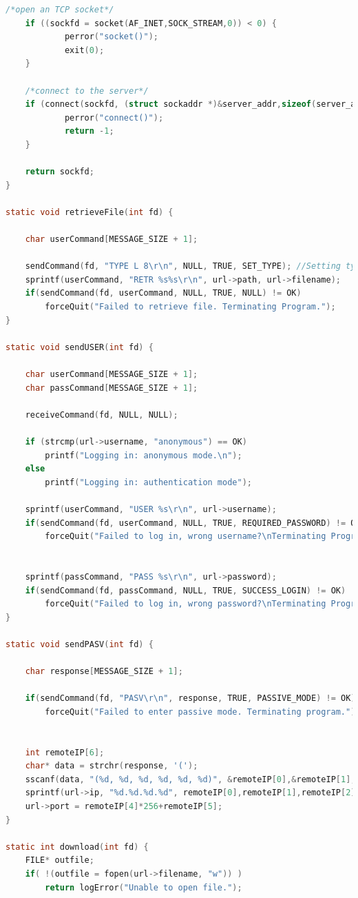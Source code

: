 \documentclass[a4paper, 11pt]{article}
\begin{document}
\begin{lstlisting}[language=C]
	/*open an TCP socket*/
	if ((sockfd = socket(AF_INET,SOCK_STREAM,0)) < 0) {
			perror("socket()");
			exit(0);
	}

	/*connect to the server*/
	if (connect(sockfd, (struct sockaddr *)&server_addr,sizeof(server_addr)) < 0){
			perror("connect()");
			return -1;
	}

	return sockfd;
}

static void retrieveFile(int fd) {

	char userCommand[MESSAGE_SIZE + 1];

	sendCommand(fd, "TYPE L 8\r\n", NULL, TRUE, SET_TYPE); //Setting type of file to be transferred -> local file
	sprintf(userCommand, "RETR %s%s\r\n", url->path, url->filename);
	if(sendCommand(fd, userCommand, NULL, TRUE, NULL) != OK)
		forceQuit("Failed to retrieve file. Terminating Program.");
}

static void sendUSER(int fd) {

	char userCommand[MESSAGE_SIZE + 1];
	char passCommand[MESSAGE_SIZE + 1];

	receiveCommand(fd, NULL, NULL);

	if (strcmp(url->username, "anonymous") == OK)
		printf("Logging in: anonymous mode.\n");
	else
		printf("Logging in: authentication mode");

	sprintf(userCommand, "USER %s\r\n", url->username);
	if(sendCommand(fd, userCommand, NULL, TRUE, REQUIRED_PASSWORD) != OK)
		forceQuit("Failed to log in, wrong username?\nTerminating Program.");


	sprintf(passCommand, "PASS %s\r\n", url->password);
	if(sendCommand(fd, passCommand, NULL, TRUE, SUCCESS_LOGIN) != OK)
		forceQuit("Failed to log in, wrong password?\nTerminating Program.");
}

static void sendPASV(int fd) {

	char response[MESSAGE_SIZE + 1];

	if(sendCommand(fd, "PASV\r\n", response, TRUE, PASSIVE_MODE) != OK)
		forceQuit("Failed to enter passive mode. Terminating program.");


	int remoteIP[6];
	char* data = strchr(response, '(');
	sscanf(data, "(%d, %d, %d, %d, %d, %d)", &remoteIP[0],&remoteIP[1],&remoteIP[2],&remoteIP[3],&remoteIP[4],&remoteIP[5]);
	sprintf(url->ip, "%d.%d.%d.%d", remoteIP[0],remoteIP[1],remoteIP[2],remoteIP[3]);
	url->port = remoteIP[4]*256+remoteIP[5];
}

static int download(int fd) {
	FILE* outfile;
	if( !(outfile = fopen(url->filename, "w")) )
		return logError("Unable to open file.");


\end{lstlisting}
\end{document}
